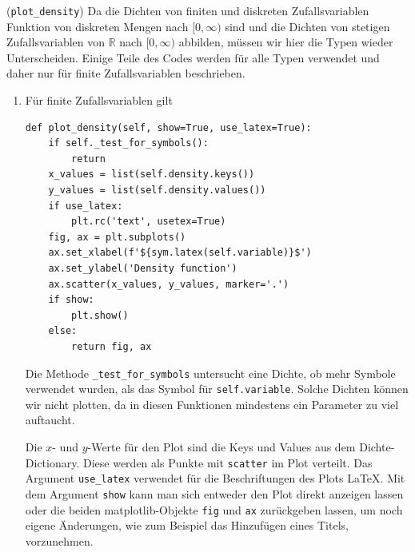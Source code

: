\begin{Code}{(\lstinline|plot_density|)}
\hypertarget{Code:PlotDensity}{}Da die Dichten von finiten und diskreten Zufallsvariablen Funktion von diskreten Mengen nach $[0, \infty)$ sind und die Dichten von stetigen Zufallsvariablen von $\mathbb{R}$ nach $[0, \infty)$ abbilden, müssen wir hier die Typen wieder Unterscheiden. Einige Teile des Codes werden für alle Typen verwendet und daher nur für finite Zufallsvariablen beschrieben.
\begin{enumerate}[label=(\roman*)]
\item Für finite Zufallsvariablen gilt
\begin{lstlisting}
def plot_density(self, show=True, use_latex=True):
    if self._test_for_symbols():
        return
    x_values = list(self.density.keys())
    y_values = list(self.density.values())
    if use_latex:
        plt.rc('text', usetex=True)
    fig, ax = plt.subplots()
    ax.set_xlabel(f'${sym.latex(self.variable)}$')
    ax.set_ylabel('Density function')
    ax.scatter(x_values, y_values, marker='.')
    if show:
        plt.show()
    else:
        return fig, ax
\end{lstlisting}

Die Methode \lstinline|_test_for_symbols| untersucht eine Dichte, ob mehr Symbole verwendet wurden, als das Symbol für \lstinline|self.variable|. Solche Dichten können wir nicht plotten, da in diesen Funktionen mindestens ein Parameter zu viel auftaucht.

\newpage

Die $x$- und $y$-Werte für den Plot sind die Keys und Values aus dem Dichte-Dictionary. Diese werden als Punkte mit \lstinline|scatter| im Plot verteilt. Das Argument \lstinline|use_latex| verwendet für die Beschriftungen des Plots \LaTeX{}. Mit dem Argument \lstinline|show| kann man sich entweder den Plot direkt anzeigen lassen oder die beiden matplotlib-Objekte \lstinline|fig| und \lstinline|ax| zurückgeben lassen, um noch eigene Änderungen, wie zum Beispiel das Hinzufügen eines Titels, vorzunehmen.


\end{enumerate}
\end{Code}
